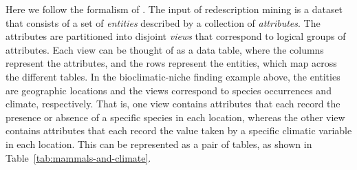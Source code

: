\documentclass[12pt,a4paper]{article}
\begin{document}
Here we follow the formalism of \cite{Galbrun-Methods}. The input of redescription mining is a dataset that consists of a set of \emph{entities} described by a collection of \emph{attributes}.  The attributes are partitioned into disjoint \emph{views} that correspond to logical groups of attributes. Each view can be thought of as a data table, where the columns represent the attributes, and the rows represent the entities, which map across the different tables.
In the bioclimatic-niche finding example above, the entities are geographic locations and the views correspond to species occurrences and climate, respectively. That is, one view contains attributes that each record the presence or absence of a specific species in each location, whereas the other view contains attributes that each record the value taken by a specific climatic variable in each location. This can be represented as a pair of tables, as shown in Table~\ref{tab:mammals-and-climate}.

\begin{table}[tb]
\caption{An example dataset, represented as a pair of data tables with mapped rows. The left-hand side table records occurrences of various species, while the right-hand side table records the values of various bio-climatic variables such as temperature (T, in \si{\degreeCelsius{}}) and precipitation (P, in \si{\milli\meter}).}
\label{tab:mammals-and-climate}
\end{table}
\end{document}
